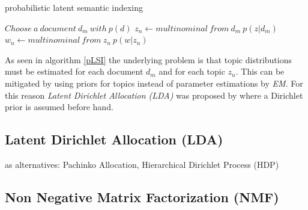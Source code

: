     \begin{algorithm}[H]
    \begin{algorithmic}[1]
      \caption{probabilistic latent semantic indexing}\label{pLSI}
      \State $Choose\:a\:document\:d_m\:with\:p(d)$
          \State $z_n \gets multinominal\:from\:d_m\:p(z|d_m)$
          \State $w_n \gets multinominal\:from\:z_n\:p(w|z_n)$
        \EndFor
    \end{algorithmic}
    \end{algorithm}

    As seen in algorithm \ref{pLSI} the underlying problem is that topic distributions must be estimated for each document $d_m$ and for each topic $z_n$. This can be mitigated by using priors for topics instead of parameter estimations by \emph{EM}. For this reason \emph{Latent Dirichlet Allocation (LDA)} was proposed by \cite{LDA2003} where a Dirichlet prior is assumed before hand.

  \subsection{Latent Dirichlet Allocation (LDA)}
    \cite{TopicModelsBlei2012,PLSA2001, LDA2003}

    as alternatives: Pachinko Allocation, Hierarchical Dirichlet Process (HDP)
    
  \subsection{Non Negative Matrix Factorization (NMF)}
    \cite{NMF1999}


